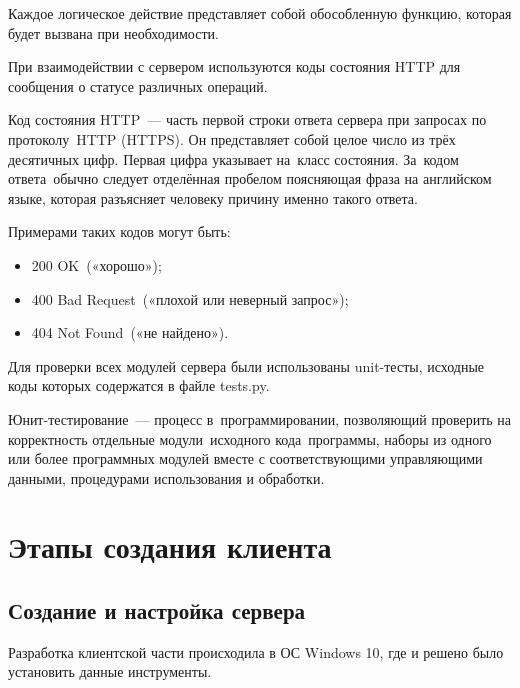 Каждое логическое действие представляет собой обособленную функцию, которая будет вызвана при необходимости.







При взаимодействии с сервером используются коды состояния HTTP для сообщения о статусе различных операций.

Код состояния HTTP --- часть первой строки ответа сервера при запросах по протоколу HTTP (HTTPS). Он представляет собой целое число из трёх десятичных цифр. Первая цифра указывает на класс состояния. За кодом ответа обычно следует отделённая пробелом поясняющая фраза на английском языке, которая разъясняет человеку причину именно такого ответа.

Примерами таких кодов могут быть:
\begin{itemize}
    \item 200 OK («хорошо»);
    \item 400 Bad Request («плохой или неверный запрос»);
    \item 404 Not Found («не найдено»).
\end{itemize}

Для проверки всех модулей сервера были использованы unit-тесты, исходные коды которых содержатся в файле tests.py.

Юнит-тестирование --- процесс в программировании, позволяющий проверить на корректность отдельные модули исходного кода программы, наборы из одного или более программных модулей вместе с соответствующими управляющими данными, процедурами использования и обработки. 


\clearpage
\section{Этапы создания клиента}
\subsection{Создание и настройка сервера}
Разработка клиентской части происходила в ОС Windows 10, где и решено было установить данные инструменты.

